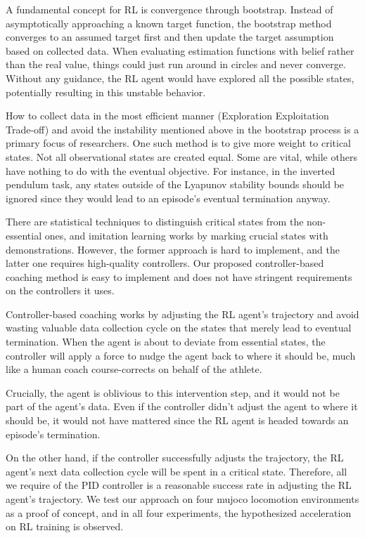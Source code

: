 \documentclass[smallextended]{svjour3}
\begin{document}
A fundamental concept for RL is convergence through bootstrap. Instead of asymptotically approaching a known target function, the bootstrap method converges to an assumed target first and then update the target assumption based on collected data. When evaluating estimation functions with belief rather than the real value, things could just run around in circles and never converge. Without any guidance, the RL agent would have explored all the possible states, potentially resulting in this unstable behavior. 

How to collect data in the most efficient manner (Exploration Exploitation Trade-off) and avoid the instability mentioned above in the bootstrap process is a primary focus of researchers. One such method is to give more weight to critical states. Not all observational states are created equal. Some are vital, while others have nothing to do with the eventual objective. For instance, in the inverted pendulum task, any states outside of the Lyapunov stability bounds should be ignored since they would lead to an episode's eventual termination anyway.  

There are statistical techniques to distinguish critical states from the non-essential ones, and imitation learning works by marking crucial states with demonstrations. However, the former approach is hard to implement, and the latter one requires high-quality controllers. Our proposed controller-based coaching method is easy to implement and does not have stringent requirements on the controllers it uses.


Controller-based coaching works by adjusting the RL agent's trajectory and avoid wasting valuable data collection cycle on the states that merely lead to eventual termination. When the agent is about to deviate from essential states, the controller will apply a force to nudge the agent back to where it should be, much like a human coach course-corrects on behalf of the athlete. 

Crucially, the agent is oblivious to this intervention step, and it would not be part of the agent's data. Even if the controller didn't adjust the agent to where it should be, it would not have mattered since the RL agent is headed towards an episode's termination. 

On the other hand, if the controller successfully adjusts the trajectory, the RL agent's next data collection cycle will be spent in a critical state. Therefore, all we require of the PID controller is a reasonable success rate in adjusting the RL agent's trajectory. We test our approach on four mujoco locomotion environments as a proof of concept, and in all four experiments, the hypothesized acceleration on RL training is observed.
\end{document}
